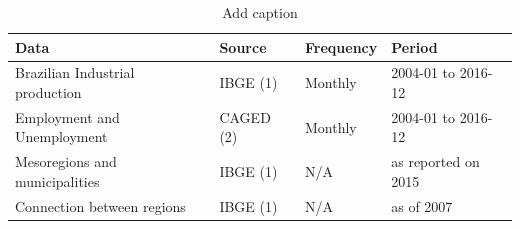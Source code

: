 \begin{table}[htbp]
  \centering
  \caption{Add caption}
    \begin{tabular}{p{14.5em}p{5.215em}p{5.145em}p{9.43em}}
    \toprule
    \textbf{Data} & \textbf{Source} & \textbf{Frequency} & \textbf{Period} \\
    \midrule
    Brazilian Industrial production & IBGE (1) & Monthly & 2004-01 to 2016-12 \\
    \midrule
    Employment and Unemployment & CAGED (2) & Monthly & 2004-01 to 2016-12 \\
    \midrule
    Mesoregions and municipalities & IBGE (1) & N/A   & as reported on 2015 \\
    \midrule
    Connection between regions & IBGE (1) & N/A   & as of 2007 \\
    \bottomrule
    \end{tabular}%
  \label{tab:addlabel}%
\end{table}%
